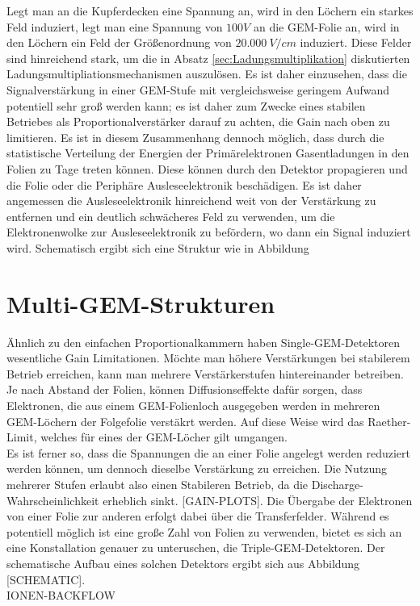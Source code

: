 		
		
\noindent Legt man an die Kupferdecken eine Spannung an, wird in den Löchern ein starkes Feld induziert, legt man eine Spannung von $100 V$ an die GEM-Folie an, wird in den Löchern ein Feld der Größenordnung von $20.000\ \si{V/cm}$ induziert. Diese Felder sind hinreichend stark, um die in Absatz \ref{sec:Ladungsmultiplikation} diskutierten Ladungsmultipliationsmechanismen auszulösen. Es ist daher einzusehen, dass die Signalverstärkung in einer GEM-Stufe mit vergleichsweise geringem Aufwand potentiell sehr groß werden kann; es ist daher zum Zwecke eines stabilen Betriebes als Proportionalverstärker darauf zu achten, die Gain nach oben zu limitieren. Es ist in diesem Zusammenhang dennoch möglich, dass durch die statistische Verteilung der Energien der Primärelektronen Gasentladungen in den Folien zu Tage treten können. Diese können durch den Detektor propagieren und die Folie oder die Periphäre Ausleseelektronik beschädigen. Es ist daher angemessen die Ausleseelektronik hinreichend weit von der Verstärkung zu entfernen und ein deutlich schwächeres Feld zu verwenden, um die Elektronenwolke zur Ausleseelektronik zu befördern, wo dann ein Signal induziert wird. Schematisch ergibt sich eine Struktur wie in Abbildung
			



\section{Multi-GEM-Strukturen}
Ähnlich zu den einfachen Proportionalkammern haben Single-GEM-Detektoren wesentliche Gain Limitationen. Möchte man höhere Verstärkungen bei stabilerem Betrieb erreichen, kann man mehrere Verstärkerstufen hintereinander betreiben. Je nach Abstand der Folien, können Diffusionseffekte dafür sorgen, dass Elektronen, die aus einem GEM-Folienloch ausgegeben werden in mehreren GEM-Löchern der Folgefolie verstäkrt werden. Auf diese Weise wird das Raether-Limit, welches für eines der GEM-Löcher gilt umgangen.\\
Es ist ferner so, dass die Spannungen die an einer Folie angelegt werden reduziert werden können, um dennoch dieselbe Verstärkung zu erreichen. Die Nutzung mehrerer Stufen erlaubt also einen Stabileren Betrieb, da die Discharge-Wahrscheinlichkeit erheblich sinkt. [GAIN-PLOTS]. Die Übergabe der Elektronen von einer Folie zur anderen erfolgt dabei über die Transferfelder. Während es potentiell möglich ist eine große Zahl von Folien zu verwenden, bietet es sich an eine Konstallation genauer zu unteruschen, die Triple-GEM-Detektoren. Der schematische Aufbau eines solchen Detektors ergibt sich aus Abbildung [SCHEMATIC].\\
IONEN-BACKFLOW

